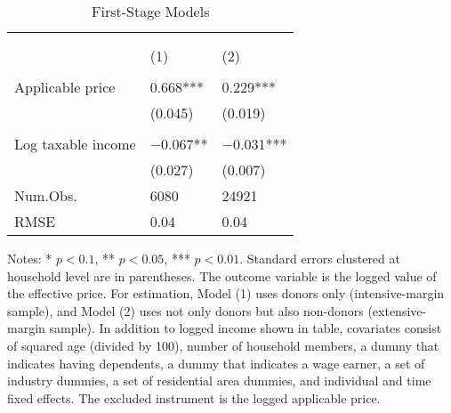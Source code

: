 \begin{table}

\caption{First-Stage Models\label{tab:main-stage1}}
\centering
\fontsize{8}{10}\selectfont
\begin{threeparttable}
\begin{tabular}[t]{l>{\centering\arraybackslash}p{18.75em}>{\centering\arraybackslash}p{18.75em}}
\toprule
\multicolumn{1}{c}{ } & \multicolumn{2}{c}{Effective price} \\
\cmidrule(l{3pt}r{3pt}){2-3}
\multicolumn{1}{c}{ } & \multicolumn{1}{c}{Donors (Intensive-margin)} & \multicolumn{1}{c}{Donors and Non-donors (Extensive-margin)} \\
\cmidrule(l{3pt}r{3pt}){2-2} \cmidrule(l{3pt}r{3pt}){3-3}
  & (1) & (2)\\
\midrule
\addlinespace[0.3em]
\multicolumn{3}{l}{\textit{Excluded instruments}}\\
\hspace{1em}Applicable price & \num{0.668}*** & \num{0.229}***\\
\hspace{1em} & (\num{0.045}) & (\num{0.019})\\
\addlinespace[0.3em]
\multicolumn{3}{l}{\textit{Covariates}}\\
\hspace{1em}Log taxable income & \num{-0.067}** & \num{-0.031}***\\
\hspace{1em} & (\num{0.027}) & (\num{0.007})\\
\midrule
Num.Obs. & \num{6080} & \num{24921}\\
RMSE & \num{0.04} & \num{0.04}\\
\bottomrule
\end{tabular}
\begin{tablenotes}
\item Notes: * $p < 0.1$, ** $p < 0.05$, *** $p < 0.01$. Standard errors clustered at household level are in parentheses. The outcome variable is the logged value of the effective price. For estimation, Model (1) uses donors only (intensive-margin sample), and Model (2) uses not only donors but also non-donors (extensive-margin sample). In addition to logged income shown in table, covariates consist of squared age (divided by 100), number of household members, a dummy that indicates having dependents, a dummy that indicates a wage earner, a set of industry dummies, a set of residential area dummies, and individual and time fixed effects. The excluded instrument is the logged applicable price.
\end{tablenotes}
\end{threeparttable}
\end{table}
